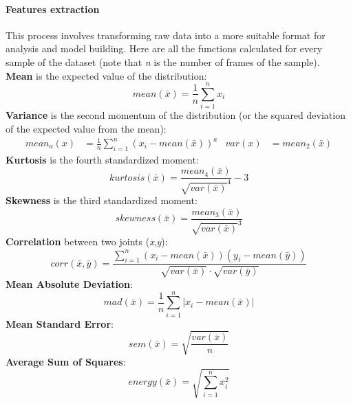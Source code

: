 \paragraph{Features extraction}
This process involves transforming raw data into a more suitable format for analysis and model building.
Here are all the functions calculated for every sample of the dataset (note that \textit{n} is the number of frames of the sample). \\

\textbf{Mean} is the expected value of the distribution:
        \begin{equation}
            mean(\bar{x}) = \frac{1}{n} \sum_{i=1}^{n} x_i
        \end{equation}
\textbf{Variance} is the second momentum of the distribution (or the squared deviation of the expected value from the mean):
        \begin{align}
            mean_a(x) &= \frac{1}{n} \sum_{i=1}^{n} (x_i - mean(\bar{x}))^a &
            var(x) &= mean_2(\bar{x})
        \end{align}
\textbf{Kurtosis} is the fourth standardized moment:
        \begin{equation}
            kurtosis(\bar{x}) = \frac{mean_4(\bar{x})}{\sqrt{var(\bar{x})}^4} - 3
        \end{equation}
\textbf{Skewness} is the third standardized moment:
        \begin{equation}
            skewness(\bar{x}) = \frac{mean_3(\bar{x})}{\sqrt{var(\bar{x})}^3}
        \end{equation}
\textbf{Correlation} between two joints (\textit{x},\textit{y}):
        \begin{equation}
            corr(\bar{x},\bar{y}) = \frac{\sum_{i=1}^n (x_i - mean(\bar{x}))(y_i - mean(\bar{y}))}{\sqrt{var(\bar{x})}\cdot\sqrt{var(\bar{y})}}
        \end{equation}
\textbf{Mean Absolute Deviation}:
        \begin{equation}
            mad(\bar{x}) = \frac{1}{n} \sum_{i=1}^{n} |x_i - mean(\bar{x})|
        \end{equation}
 \textbf{Mean Standard Error}:
        \begin{equation}
            sem(\bar{x}) = \sqrt{\frac{var(\bar{x})}{n}}
        \end{equation}
\textbf{Average Sum of Squares}:
        \begin{equation}
            energy(\bar{x}) = \sqrt{\sum_{i=1}^{n} x_i^2}
        \end{equation}
